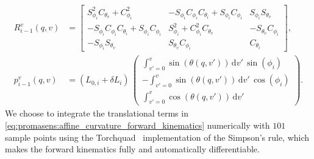 \begin{equation}\label{eq:promasens:affine_curvature_forward_kinematics}
\begin{split}
    R_{i-1}^v(q,v) &= \begin{bmatrix}
        S_{\phi_i}^2 C_{\theta_v} + C_{\phi_i}^2 & -S_{\phi_i} C_{\phi_i} C_{\theta_i} + S_{\phi_i}C_{\phi_i} & S_{\phi_i} S_{\theta_v}\\
        -S_{\phi_i} C_{\phi_i} C_{\theta_i} + S_{\phi_i} C_{\phi_i} & S_{\phi_i}^2 + C_{\phi_i}^2 C_{\theta_v} & -S_{\theta_v} C_{\phi_i}\\
        -S_{\phi_i} S_{\theta_v} & S_{\theta_v} C_{\phi_i} & C_{\theta_i}
    \end{bmatrix},\\
    p_{i-1}^{v}(q,v) &= \left ( L_{0,i} + \delta L_i \right ) \, \begin{pmatrix}
        \int_{v'=0}^{v} \sin(\theta(q, v')) \, \mathrm{d}v' \, \sin(\phi_i)\\
        - \int_{v'=0}^{v} \sin(\theta(q, v')) \, \mathrm{d}v' \, \cos(\phi_i)\\
        \int_{v'=0}^{v} \cos(\theta(q, v')) \, \mathrm{d}v'
    \end{pmatrix}.
\end{split}
\end{equation}
We choose to integrate the translational terms in \eqref{eq:promasens:affine_curvature_forward_kinematics} numerically with $101$ sample points using the Torchquad~\cite{gomez2021torchquad} implementation of the Simpson's rule, which makes the forward kinematics fully and automatically differentiable.


